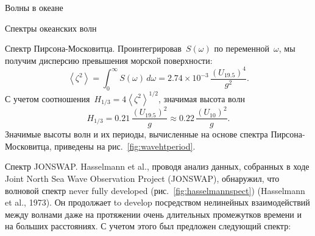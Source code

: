 \begin{chapter}{Волны в океане}
\begin{section}{Спектры океанских волн}
\begin{paragraph}{Спектр Пирсона-Московитца.}
Проинтегрировав~$S(\omega)$ по переменной~$\omega$, мы получим дисперсию
превышения морской поверхности:
\begin{equation}
 \left<\zeta ^{2}\right> 
   = \int_{0}^{\infty} S(\omega )\, d \omega 
   = 2.74 \times 10^{-3} \,\frac{\left(U_{19.5}\right)^4}{g^2}.
\end{equation}
С учетом соотношения~$H_{1/3} = 4 \left<\zeta ^{2}\right>^{1/2}$, 
значимая высота волн
\begin{equation}\label{eq:16.33}
 H_{1/3} = 0.21 \, \frac{\left(U_{19.5} \right)^2}{g}
         \approx 0.22 \,\frac{\left(U_{10} \right)^2}{g}.
\end{equation}
Значимые высоты волн и их периоды, вычисленные на основе спектра 
Пирсона-Московитца, приведены на рис.~\ref{fig:wavehtperiod}.
%
\end{paragraph}

\begin{paragraph}{Спектр JONSWAP.}
Hasselmann et al., проводя анализ данных, собранных в ходе 
Joint North Sea Wave Observation Project (JONSWAP), 
обнаружил, что волновой спектр never fully developed 
(рис.~\ref{fig:hasselmannspect}) (Hasselmann et al., 1973). 
Он продолжает to develop посредством нелинейных взаимодействий 
между волнами даже на протяжении очень длительных промежутков времени
и на больших расстояниях. С учетом этого был предложен следующий спектр:
%


\end{paragraph}
\end{section}
\end{chapter}
